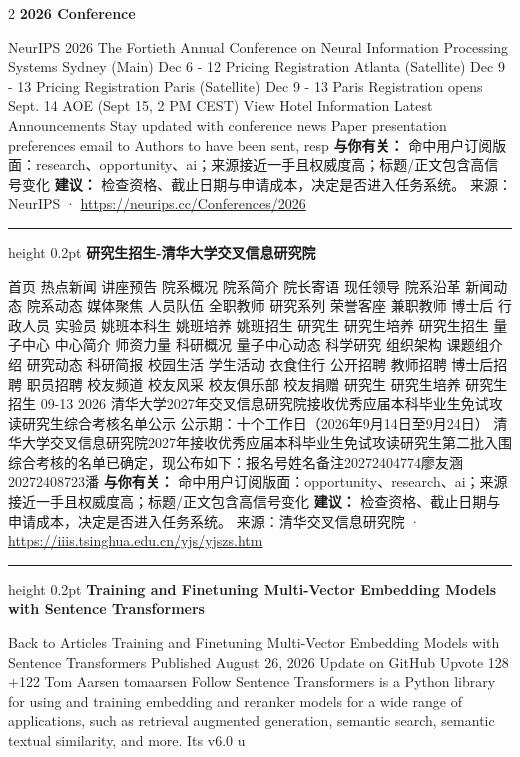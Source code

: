 \documentclass[10.5pt]{ctexart}
\begin{document}
\begin{multicols}{2}
{\large\bfseries 2026 Conference}\par
NeurIPS 2026 The Fortieth Annual Conference on Neural Information Processing Systems Sydney (Main) Dec 6 - 12 Pricing Registration Atlanta (Satellite) Dec 9 - 13 Pricing Registration Paris (Satellite) Dec 9 - 13 Paris Registration opens Sept. 14 AOE (Sept 15, 2 PM CEST) View Hotel Information Latest Announcements Stay updated with conference news Paper presentation preferences email to Authors to have been sent, resp
\textbf{与你有关：} 命中用户订阅版面：research、opportunity、ai；来源接近一手且权威度高；标题/正文包含高信号变化
\textbf{建议：} 检查资格、截止日期与申请成本，决定是否进入任务系统。
{\footnotesize\color{ormuted} 来源：NeurIPS · \url{https://neurips.cc/Conferences/2026}}
\vspace{2mm}
\hrule height 0.2pt
\vspace{2mm}
{\large\bfseries 研究生招生-清华大学交叉信息研究院}\par
首页 热点新闻 讲座预告 院系概况 院系简介 院长寄语 现任领导 院系沿革 新闻动态 院系动态 媒体聚焦 人员队伍 全职教师 研究系列 荣誉客座 兼职教师 博士后 行政人员 实验员 姚班本科生 姚班培养 姚班招生 研究生 研究生培养 研究生招生 量子中心 中心简介 师资力量 科研概况 量子中心动态 科学研究 组织架构 课题组介绍 研究动态 科研简报 校园生活 学生活动 衣食住行 公开招聘 教师招聘 博士后招聘 职员招聘 校友频道 校友风采 校友俱乐部 校友捐赠 研究生 研究生培养 研究生招生 09-13 2026 清华大学2027年交叉信息研究院接收优秀应届本科毕业生免试攻读研究生综合考核名单公示 公示期：十个工作日（2026年9月14日至9月24日） 清华大学交叉信息研究院2027年接收优秀应届本科毕业生免试攻读研究生第二批入围综合考核的名单已确定，现公布如下：报名号姓名备注20272404774廖友涵20272408723潘
\textbf{与你有关：} 命中用户订阅版面：opportunity、research、ai；来源接近一手且权威度高；标题/正文包含高信号变化
\textbf{建议：} 检查资格、截止日期与申请成本，决定是否进入任务系统。
{\footnotesize\color{ormuted} 来源：清华交叉信息研究院 · \url{https://iiis.tsinghua.edu.cn/yjs/yjszs.htm}}
\vspace{2mm}
\hrule height 0.2pt
\vspace{2mm}
{\large\bfseries Training and Finetuning Multi-Vector Embedding Models with Sentence Transformers}\par
Back to Articles Training and Finetuning Multi-Vector Embedding Models with Sentence Transformers Published August 26, 2026 Update on GitHub Upvote 128 +122 Tom Aarsen tomaarsen Follow Sentence Transformers is a Python library for using and training embedding and reranker models for a wide range of applications, such as retrieval augmented generation, semantic search, semantic textual similarity, and more. Its v6.0 u

\end{multicols}
\end{document}
